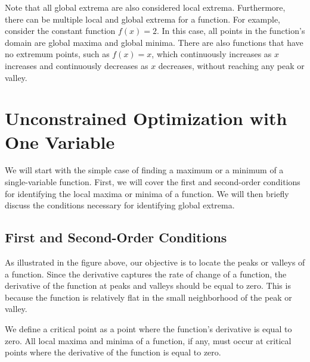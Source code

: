 \documentclass{./../Latex/handout}
\begin{document}
Note that all global extrema are also considered local extrema. Furthermore, there can be multiple local and global extrema for a function. For example, consider the constant function $f(x) = 2$. In this case, all points in the function's domain are global maxima and global minima. There are also functions that have no extremum points, such as $f(x)=x$, which continuously increases as $x$ increases and continuously decreases as $x$ decreases, without reaching any peak or valley.


\section{Unconstrained Optimization with One Variable}

We will start with the simple case of finding a maximum or a minimum of a single-variable function.  First, we will cover the first and second-order conditions for identifying the local maxima or minima of a function. We will then briefly discuss the conditions necessary for identifying global extrema.


\subsection{First and Second-Order Conditions}
 
As illustrated in the figure above, our objective is to locate the peaks or valleys of a function.  Since the derivative captures the rate of change of a function, the derivative of the function at peaks and valleys should be equal to zero. This is because the function is relatively flat in the small neighborhood of the peak or valley. 

We define a critical point as a point where the function's derivative is equal to zero. All local maxima and minima of a function, if any, must occur at critical points where the derivative of the function is equal to zero. \\

\\
\end{document}
